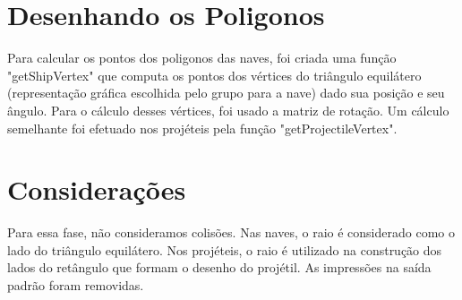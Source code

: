 \documentclass{article}
\begin{document}
\section{Desenhando os Poligonos}
Para calcular os pontos dos poligonos das naves, foi criada uma função "getShipVertex" que computa os pontos dos vértices do triângulo equilátero (representação gráfica escolhida pelo grupo para a nave) dado sua posição e seu ângulo. Para o cálculo desses vértices, foi usado a matriz de rotação. Um cálculo semelhante foi efetuado nos projéteis pela função "getProjectileVertex".

\section{Considerações}
Para essa fase, não consideramos colisões. Nas naves, o raio é considerado como o lado do triângulo equilátero. Nos projéteis, o raio é utilizado na construção dos lados do retângulo que formam o desenho do projétil.
As impressões na saída padrão foram removidas.
\end{document}
